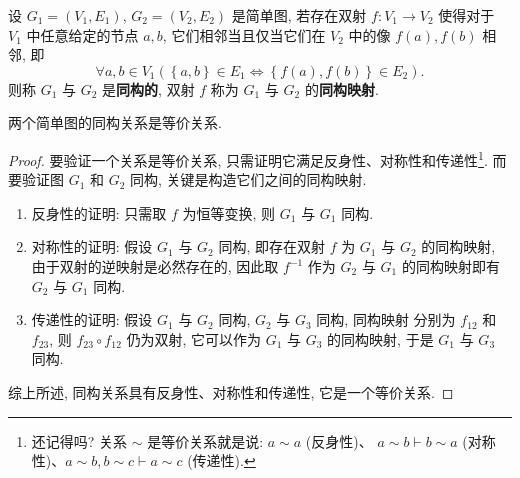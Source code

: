 \documentclass[10pt,UTF8]{book} %
\begin{document}
\begin{definition}
    设 $G_1 = (V_1, E_1)$, $G_2 = (V_2, E_2)$ 是简单图, 若存在双射 $f: V_1 \to V_2$
    使得{\kaishu 对于 $V_1$ 中任意给定的节点 $a,b$, 它们相邻当且仅当它们在 $V_2$ 中的像
    $f(a), f(b)$ 相邻}, 即
    \[ \forall a,b \in V_1 \left( \left\{ a,b \right\} \in E_1 
    \iff \left\{ f(a), f(b) \right\} \in E_2 \right). \]
    则称 $G_1$ 与 $G_2$ 是\textbf{同构的}, 双射 $f$ 称为 $G_1$ 与 $G_2$ 
    的\textbf{同构映射}.
\end{definition}
\setcounter{property}{0}
\begin{property}
    两个简单图的同构关系是等价关系.
    \begin{proof}
        要验证一个关系是等价关系, 只需证明它满足反身性、对称性和传递性\footnote{
            还记得吗? 关系 $\sim$ 是等价关系就是说: $a \sim a$ (反身性)、
            $a \sim b \vdash b \sim a$ (对称性)、$a \sim b, b \sim c \vdash 
            a \sim c$ (传递性).
        }. 而要验证图 $G_1$ 和 $G_2$
        同构, 关键是构造它们之间的同构映射.
        \begin{enumerate}[label={$\left.\mathrm{\alph*}\right)$}, itemsep=0pt]
            \item 反身性的证明: 只需取 $f$ 为恒等变换, 则 $G_1$ 与 $G_1$ 同构.
            \item 对称性的证明: 假设 $G_1$ 与 $G_2$ 同构, 即存在双射 $f$ 为 $G_1$ 与
            $G_2$ 的同构映射, 由于双射的逆映射是必然存在的, 因此取 $f^{-1}$ 作为 $G_2$
            与 $G_1$ 的同构映射即有 $G_2$ 与 $G_1$ 同构.
            \item 传递性的证明: 假设 $G_1$ 与 $G_2$ 同构, $G_2$ 与 $G_3$ 同构, 同构映射
            分别为 $f_{12}$ 和 $f_{23}$, 则 $f_{23} \circ f_{12}$ 仍为双射, 它可以作为
            $G_1$ 与 $G_3$ 的同构映射, 于是 $G_1$ 与 $G_3$ 同构.
        \end{enumerate}
        综上所述, 同构关系具有反身性、对称性和传递性, 它是一个等价关系.
    \end{proof}
\end{property}




\end{document}
